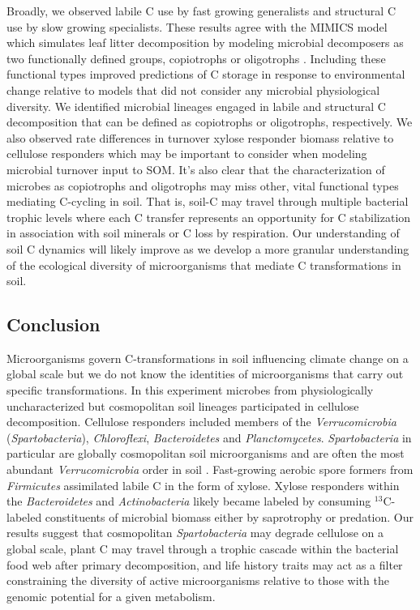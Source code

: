 Broadly, we observed labile C use by fast growing generalists and structural
C use by slow growing specialists. These results agree with the MIMICS model
which simulates leaf litter decomposition by modeling microbial decomposers
as two functionally defined groups, copiotrophs or oligotrophs
\citep{wieder_2014a}. Including these functional types improved predictions
of C storage in response to environmental change relative to models that did
not consider any microbial physiological diversity. We identified
microbial lineages engaged in labile and structural C decomposition that
can be defined as copiotrophs or oligotrophs, respectively. We also
observed rate differences in turnover xylose responder biomass relative to
cellulose responders which may be important to consider when modeling
microbial turnover input to SOM. It's also clear that the characterization
of microbes as copiotrophs and oligotrophs may miss other, vital
functional types mediating C-cycling in soil. That is, soil-C may travel
through multiple bacterial trophic levels where each C transfer represents
an opportunity for C stabilization in association with soil minerals or
C loss by respiration. Our understanding of soil C dynamics will likely
improve as we develop a more granular understanding of the ecological
diversity of microorganisms that mediate C transformations in soil.

\subsection{Conclusion} 
Microorganisms govern C-transformations in soil influencing climate change
on a global scale but we do not know the identities of microorganisms that
carry out specific transformations. In this
experiment microbes from physiologically uncharacterized but cosmopolitan
soil lineages participated in cellulose decomposition. Cellulose
responders included members of the \textit{Verrucomicrobia}
(\textit{Spartobacteria}), \textit{Chloroflexi}, \textit{Bacteroidetes}
and \textit{Planctomycetes}. \textit{Spartobacteria} in particular are
globally cosmopolitan soil microorganisms and are often the most abundant
\textit{Verrucomicrobia} order in soil \citep{Bergmann_2011}. Fast-growing
aerobic spore formers from \textit{Firmicutes} assimilated labile C in the
form of xylose. Xylose responders within the \textit{Bacteroidetes} and
\textit{Actinobacteria} likely became labeled by consuming
$^{13}$C-labeled constituents of microbial biomass either by saprotrophy
or predation. Our results suggest that cosmopolitan
\textit{Spartobacteria} may degrade cellulose on a global scale, plant
C may travel through a trophic cascade within the bacterial food web after
primary decomposition, and life history traits may act as a filter
constraining the diversity of active microorganisms relative to those with
the genomic potential for a given metabolism.
